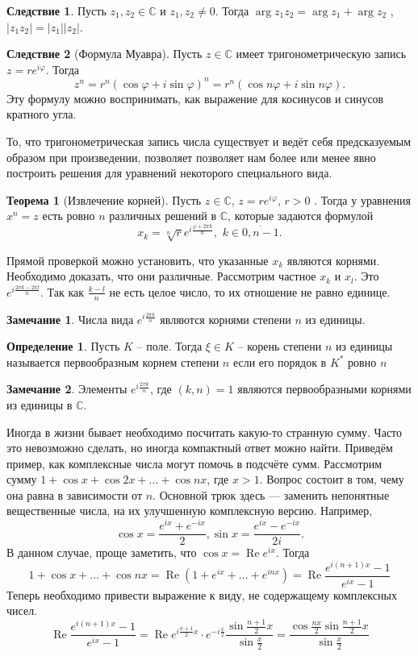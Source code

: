 \documentclass[10pt,a4paper,oneside]{book}
\theoremstyle{definition}
\newtheorem*{rem}{Замечание}
\newtheorem*{defn}{Определение}
\newtheorem{thm}{Теорема}
\newtheorem{cor}{Следствие}
\newcommand{\mb}[1]{\mathbb{#1}}
\newcommand{\ovl}{\overline}
\newcommand{\re}{\operatorname{Re}}
\def\thrm{\begin{thm}}
\def\ethrm{\end{thm}}
\def\dfn{\begin{defn}}
\def\edfn{\end{defn}}
\def\crl{\begin{cor}}
\def\ecrl{\end{cor}}
\def\rm{\begin{rem}}
\def\erm{\end{rem}}
\begin{document}
\crl Пусть $z_1, z_2\in \mb C$  и $z_1,z_2\neq 0$. Тогда $\arg z_1z_2 = \arg z_1 + \arg z_2$ , $|z_1z_2| = |z_1 ||z_2 |$.
\ecrl

\crl[Формула Муавра] Пусть $z\in \mb C$ имеет тригонометрическую запись $z=re^{i\varphi}$. Тогда
$$z^{n}=r^{n}(\cos \varphi +i\sin \varphi )^{n}=r^{n}(\cos n\varphi +i\sin n\varphi ).$$
Эту формулу можно воспринимать, как выражение для косинусов и синусов кратного угла.
\ecrl

То, что тригонометрическая запись числа существует и ведёт себя предсказуемым образом при произведении, позволяет позволяет нам более или менее явно построить решения для уравнений некоторого специального вида.

\thrm[Извлечение корней] Пусть $z\in \mb C$, $z=re^{i\varphi}$, $r>0$ . Тогда у уравнения $x^n=z$ есть ровно $n$ различных
решений в $\mb C$, которые задаются формулой
$$ x_k =\sqrt[n]{r} e^{i\frac{\varphi + 2\pi k}{n}} ,\,\, k\in \ovl{0,n-1}.$$
\ethrm
\proof
Прямой проверкой можно установить, что указанные $x_k$ являются корнями. Необходимо доказать, что они различные. Рассмотрим частное $x_k$ и $x_l$. Это $e^{i\frac{ 2\pi k- 2\pi l}{n}}$. Так как $\frac{k-l}{n}$ не есть целое число, то их отношение не равно единице.
\endproof

\rm Числа вида $e^{i\frac{2\pi k}{n}}$ являются корнями степени $n$ из единицы.
\erm

\dfn Пусть $K$ -- поле. Тогда $\xi\in K$ -- корень степени $n$ из единицы  называется первообразным корнем степени $n$ если его порядок в $ K^*$ ровно $n$
\edfn

\rm Элементы $e^{i\frac{2\pi k}{n}}$, где $(k,n)=1$ являются первообразными корнями из единицы в $\mb C$.
\erm



Иногда в жизни бывает необходимо посчитать какую-то странную сумму. Часто это невозможно сделать, но иногда компактный ответ можно найти. Приведём пример, как комплексные числа могут помочь в подсчёте сумм.
Рассмотрим сумму $1+ \cos x + \cos 2x + \dots + \cos nx$, где $x > 1$. Вопрос состоит в том, чему она равна в зависимости от $n$. Основной трюк здесь --- заменить непонятные вещественные числа, на их улучшенную комплексную версию. Например, $$\cos x = \frac{e^{ix}+e^{-ix}}{2}, \sin x = \frac{e^{ix}-e^{-ix}}{2i}.$$
В данном случае, проще заметить, что $\cos x=\re e^{ix}$. Тогда
$$1 + \cos x+ \dots + \cos nx = \re(1+ e^{ix} + \dots + e^{inx}) = \re \frac{e^{i(n+1)x}-1}{e^{ix}-1}$$
Теперь необходимо привести выражение к виду, не содержащему комплексных чисел.
$$\re \frac{e^{i(n+1)x}-1}{e^{ix}-1} = \re e^{i\tfrac{n+1}{2}x}\cdot e^{-i\tfrac{x}{2}}\frac{\sin \tfrac{n+1}{2}x}{\sin\tfrac{x}{2}}= \frac{\cos \tfrac{nx}{2} \sin \tfrac{n+1}{2}x}{\sin\tfrac{x}{2}}$$
\end{document}
